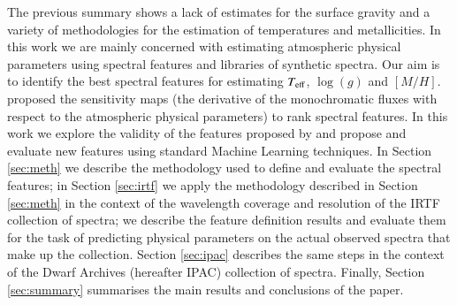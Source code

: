 The previous summary shows a lack of estimates for the surface gravity
and a variety of methodologies for the estimation of temperatures and
metallicities. In this work we are mainly concerned with estimating
atmospheric physical parameters using spectral features and libraries
of synthetic spectra. Our aim is to identify the best spectral
features for estimating $T_{\rm eff}$, $\log(g)$ and
$[M/H]$. \cite{cesetti} proposed the sensitivity maps (the derivative
of the monochromatic fluxes with respect to the atmospheric physical
parameters) to rank spectral features. In this work we explore the
validity of the features proposed by \cite{cesetti} and propose and
evaluate new features using standard Machine Learning techniques. In
Section \ref{sec:meth} we describe the methodology used to define and
evaluate the spectral features; in Section \ref{sec:irtf} we apply the
methodology described in Section \ref{sec:meth} in the context of the
wavelength coverage and resolution of the IRTF collection of spectra;
we describe the feature definition results and evaluate them for the
task of predicting physical parameters on the actual observed spectra
that make up the collection. Section \ref{sec:ipac} describes the same
steps in the context of the Dwarf Archives (hereafter IPAC) collection
of spectra. Finally, Section \ref{sec:summary} summarises the main
results and conclusions of the paper.
